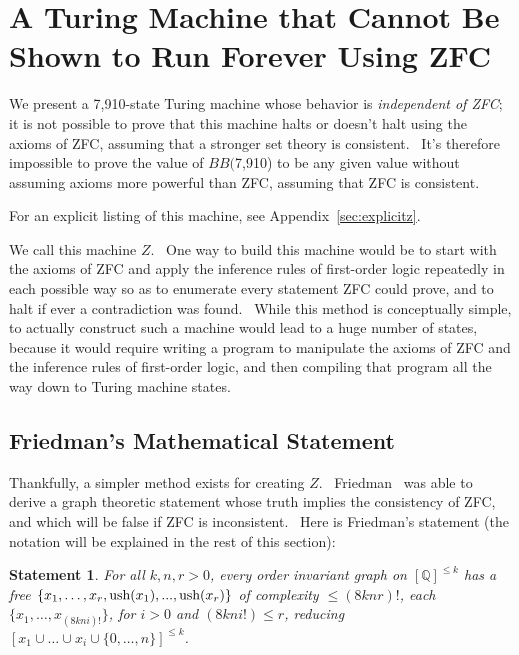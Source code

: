 \documentclass[11pt]{article}
\newtheorem{statement}{Statement}
\newcommand{\statenumstate}{7,910-state }
\newcommand{\bbstatenum}{$BB($7,910) }
\begin{document}
\section{A Turing Machine that Cannot Be Shown to Run Forever Using ZFC}

We present a \statenumstate Turing machine whose behavior is \emph{independent of ZFC}; it is not possible to prove that this machine halts or doesn't halt using the axioms of ZFC, assuming that a stronger set theory is consistent. \ It's therefore impossible to prove the value of \bbstatenum to be any given value without assuming axioms more powerful than ZFC, assuming that ZFC is consistent.

For an explicit listing of this machine, see Appendix~\ref{sec:explicitz}.

We call this machine $Z$. \ One way to build this machine would be to start with the axioms of ZFC and apply the inference rules of first-order logic repeatedly in each possible way so as to enumerate every statement ZFC could prove, and to halt if ever a contradiction was found. \ While this method is conceptually simple, to actually construct such a machine would lead to a huge number of states, because it would require writing a program to manipulate the axioms of ZFC and the inference rules of first-order logic, and then compiling that program all the way down to Turing machine states.

\subsection{Friedman's Mathematical Statement} \label{sec:friedmanstate}

Thankfully, a simpler method exists for creating $Z$. \ Friedman~\cite{friedman}
was able to derive a graph theoretic statement whose truth implies the consistency of ZFC, and which will be false if ZFC is inconsistent.\footnotemark
{} \
Here is Friedman's statement (the notation will be explained in the rest of this section):

\begin{statement} \label{eq:friedman}
For all $k, n, r > 0$, every order invariant graph on $[\mathbb{Q}]^{\le k}$ has a free $\{x_1,\dots,x_r, \\
\textrm{ush}(x_1),...,\textrm{ush}(x_r)\}$ of complexity $\le (8knr)!$, each $\{x_1, \dots, x_{(8kni)!}\}$, for $i > 0$ and $(8kni!) \le r$, reducing $[x_1 \cup \dots \cup x_i \cup \{0,\dots,n\}]^{\le k}$. \cite{friedman}
\end{statement}
\end{document}
